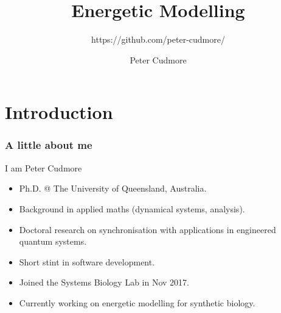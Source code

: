 \documentclass[12pt,reqno]{beamer}
\title{Energetic Modelling}
\author{Peter Cudmore}
\subtitle{https://github.com/peter-cudmore/}
\date{}
\begin{document}
	\begin{frame}
	\titlepage
	\addtocounter{framenumber}{-1} 
\end{frame}
\section{Introduction}
\begin{frame}
\frametitle{A little about me}
I am Peter Cudmore
\begin{itemize}
\item Ph.D. @ The University of Queensland, Australia.
\item Background in applied maths (dynamical systems, analysis).
\item Doctoral research on synchronisation with applications in engineered quantum systems.
\item Short stint in software development.
\item Joined the Systems Biology Lab in Nov 2017.
\item Currently working on energetic modelling for synthetic biology.
\end{itemize}
\end{frame}
\end{document}
